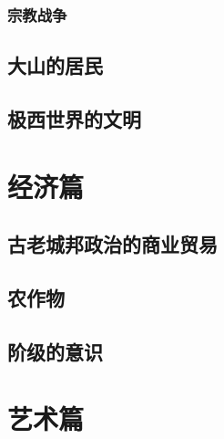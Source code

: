 \documentclass[UTF8,12pt,draft]{ctexbook}
\begin{document}
        \section{宗教战争}


    \chapter{大山的居民}
    \chapter{极西世界的文明}



\part{经济篇}
    \chapter{古老城邦政治的商业贸易}

    \chapter{农作物}

    \chapter{阶级的意识}

\part{艺术篇}
\end{document}
